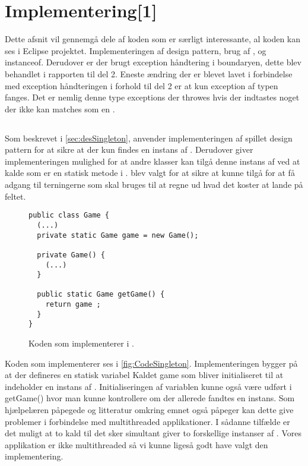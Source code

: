 \FloatBarrier
\chapter{Implementering[1]}\label{chap:Implementering}
Dette afsnit vil gennemgå dele af koden som er særligt interessante, al koden kan ses i Eclipse projektet. Implementeringen af  design pattern, brug af ,  og instanceof. Derudover er der brugt exception håndtering i boundaryen, dette blev behandlet i rapporten til del 2. Eneste ændring der er blevet lavet i forbindelse med exception håndteringen i forhold til del 2 er at kun exception af typen  fanges. Det er nemlig denne type exceptions der throwes hvis der indtastes noget der ikke kan matches som en . \cite{javaExceptionInputMismatchException}

\section{}
Som beskrevet i \vref{sec:desSingleton}, anvender implementeringen af spillet  design pattern for at sikre at der kun findes en instans af . Derudover giver implementeringen mulighed for at andre klasser kan tilgå denne instans af  ved at kalde  som er en statisk metode i .  blev valgt for at sikre at  kunne tilgå  for at få adgang til terningerne som skal bruges til at regne ud hvad det koster at lande på feltet.

\begin{figure}
\caption{Koden som implementerer  i .}
\label{fig:CodeSingleton}
\centering
\begin{lstlisting}
public class Game {
  (...)
  private static Game game = new Game();

  private Game() {
    (...)
  }

  public static Game getGame() {
    return game ;
  }
}
\end{lstlisting}
\end{figure}

Koden som implementerer  ses i \vref{fig:CodeSingleton}. Implementeringen bygger på at der defineres en statisk variabel Kaldet game som bliver initialiseret til at indeholder en instans af . Initialiseringen af variablen kunne også være udført i getGame() hvor man kunne kontrollere om der allerede fandtes en instans. Som hjælpelæren påpegede og litteratur omkring emnet også påpeger kan dette give problemer i forbindelse med multithreaded applikationer. I sådanne tilfælde er det muligt at to kald til  det sker simultant giver to forskellige instanser af . Vores applikation er ikke multithreaded så vi kunne ligeså godt have valgt den implementering.

